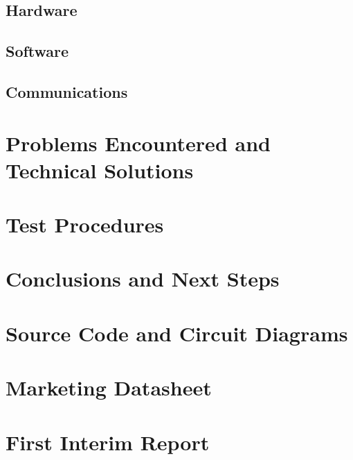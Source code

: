 \documentclass[a4paper,10pt]{article}  %
\begin{document}
\subsection{Hardware}
\label{sec:hardware}



\subsection{Software}
\label{sec:software}

\subsection{Communications}

\section{Problems Encountered and Technical Solutions}
\label{sec:probl-enco-techn}

\section{Test Procedures}
\label{sec:test-procedures}

\section{Conclusions and Next Steps}
\label{sec:concl-next-steps}

\appendix

\section{Source Code and Circuit Diagrams}
\label{sec:source-code-circuit}

\section{Marketing Datasheet}
\label{sec:marketing-datasheet}

\section{First Interim Report}
\label{sec:first-interim-report}



\end{document}

